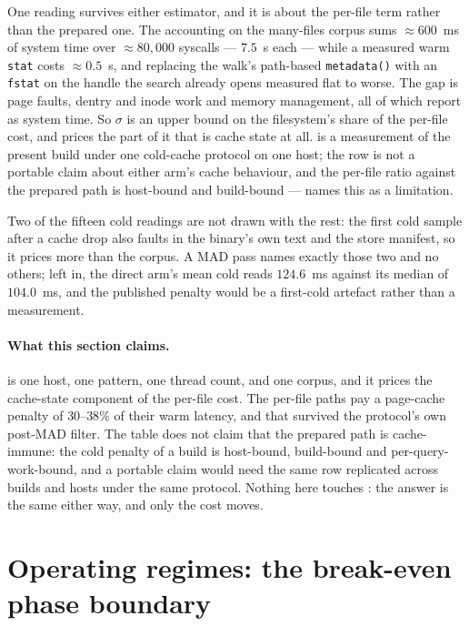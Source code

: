 \documentclass[11pt,letterpaper]{article}
\begin{document}
One reading survives either estimator, and it is about the per-file term
rather than the prepared one. The accounting on the many-files corpus sums
$\approx 600$~ms of system time over $\approx 80{,}000$ syscalls ---
$7.5$~\textmu s each --- while a measured warm \texttt{stat} costs
$\approx 0.5$~\textmu s, and replacing the walk's path-based
\texttt{metadata()} with an \texttt{fstat} on the handle the search already
opens measured flat to worse. The gap is page faults, dentry and inode work
and memory management, all of which report as system time. So $\sigma$ is
an upper bound on the filesystem's share of the per-file cost, and
 prices the part of it that is cache state at all.
 is a measurement of the present build under one cold-cache
protocol on one host; the row is not a portable claim about either arm's
cache behaviour, and the per-file ratio against the prepared path is
host-bound and build-bound ---  names this as a
limitation.

Two of the fifteen cold readings are not drawn with the rest: the first
cold sample after a cache drop also faults in the binary's own text and
the store manifest, so it prices more than the corpus. A MAD pass names
exactly those two and no others; left in, the direct arm's mean cold reads
$124.6$~ms against its median of $104.0$~ms, and the published penalty
would be a first-cold artefact rather than a measurement.

\paragraph{What this section claims.}
 is one host, one pattern, one thread count, and one
corpus, and it prices the cache-state component of the per-file cost.
The per-file paths pay a page-cache penalty of $30$--$38\%$ of their
warm latency, and that survived the protocol's own post-MAD filter. The
table does not claim that the prepared path is cache-immune: the cold
penalty of a build is host-bound, build-bound and per-query-work-bound,
and a portable claim would need the same row replicated across builds
and hosts under the same protocol. Nothing here touches
: the answer is the same either way, and only the
cost moves.

\section{Operating regimes: the break-even phase boundary}
\label{sec:regimes}
\end{document}
